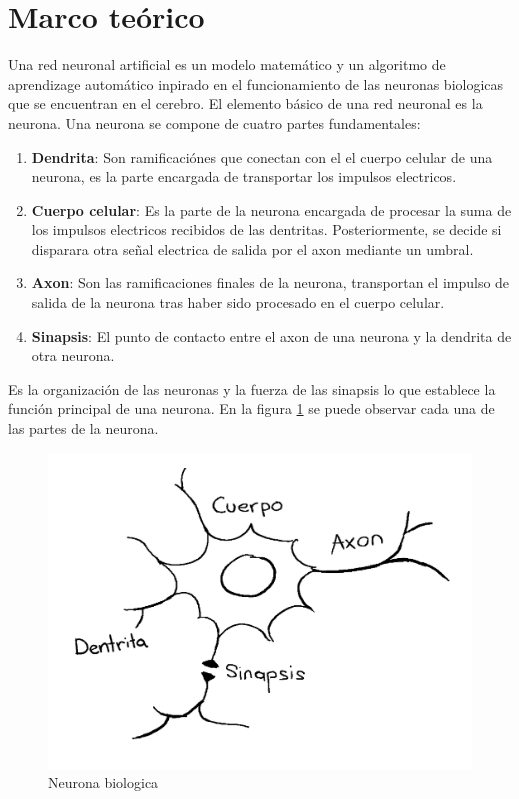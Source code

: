 \documentclass{article}
\begin{document}
\section{Marco teórico}\label{sec:Marco}
Una red neuronal artificial es un modelo matemático y un algoritmo de aprendizage automático inpirado en el funcionamiento de las neuronas biologicas que se encuentran en el cerebro.
El elemento básico de una red neuronal es la neurona. Una neurona se compone de cuatro partes fundamentales:
\begin{enumerate}
    \item \textbf{Dendrita}: Son ramificaciónes que conectan con el el cuerpo celular de una neurona, es la parte encargada de transportar los impulsos electricos.  
    \item \textbf{Cuerpo celular}: Es la parte de la neurona encargada de procesar la suma de los impulsos electricos recibidos de las dentritas. Posteriormente, se decide si disparara otra señal electrica de salida por el axon mediante un umbral.
    \item \textbf{Axon}: Son las ramificaciones finales de la neurona, transportan el impulso de salida de la neurona tras haber sido procesado en el cuerpo celular.
    \item \textbf{Sinapsis}: El punto de contacto entre el axon de una neurona y la dendrita de otra neurona. 
\end{enumerate} 
Es la organización de las neuronas y la fuerza de las sinapsis lo que establece la función principal de una neurona. En la figura \ref{neuron} se puede observar cada una de las partes de la neurona. 
\begin{figure}[H]
    \centering
    \includegraphics[width=130mm]{neuron.png}
    \caption{Neurona biologica}
    \label{neuron}
\end{figure}
\end{document}
